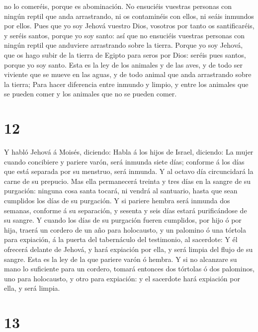 no lo comeréis, porque es abominación.  No ensuciéis
vuestras personas con ningún reptil que anda arrastrando, ni os
contaminéis con ellos, ni seáis inmundos por ellos.  Pues
que yo soy Jehová vuestro Dios, vosotros por tanto os santificaréis, y
seréis santos, porque yo soy santo: así que no ensuciéis vuestras
personas con ningún reptil que anduviere arrastrando sobre la tierra.
 Porque yo soy Jehová, que os hago subir de la tierra de
Egipto para seros por Dios: seréis pues santos, porque yo soy santo.
 Esta es la ley de los animales y de las aves, y de todo
ser viviente que se mueve en las aguas, y de todo animal que anda
arrastrando sobre la tierra;  Para hacer diferencia entre
inmundo y limpio, y entre los animales que se pueden comer y los
animales que no se pueden comer.

\hypertarget{section-11}{%
\section{12}\label{section-11}}

 Y habló Jehová á Moisés, diciendo:  Habla á los
hijos de Israel, diciendo: La mujer cuando concibiere y pariere varón,
será inmunda siete días; conforme á los días que está separada por su
menstruo, será inmunda.  Y al octavo día circuncidará la
carne de su prepucio.  Mas ella permanecerá treinta y tres
días en la sangre de su purgación: ninguna cosa santa tocará, ni vendrá
al santuario, hasta que sean cumplidos los días de su purgación.
 Y si pariere hembra será inmunda dos semanas, conforme á su
separación, y sesenta y seis días estará purificándose de su sangre.
 Y cuando los días de su purgación fueren cumplidos, por
hijo ó por hija, traerá un cordero de un año para holocausto, y un
palomino ó una tórtola para expiación, á la puerta del tabernáculo del
testimonio, al sacerdote:  Y él ofrecerá delante de Jehová,
y hará expiación por ella, y será limpia del flujo de su sangre. Esta es
la ley de la que pariere varón ó hembra.  Y si no alcanzare
su mano lo suficiente para un cordero, tomará entonces dos tórtolas ó
dos palominos, uno para holocausto, y otro para expiación: y el
sacerdote hará expiación por ella, y será limpia.

\hypertarget{section-12}{%
\section{13}\label{section-12}}

